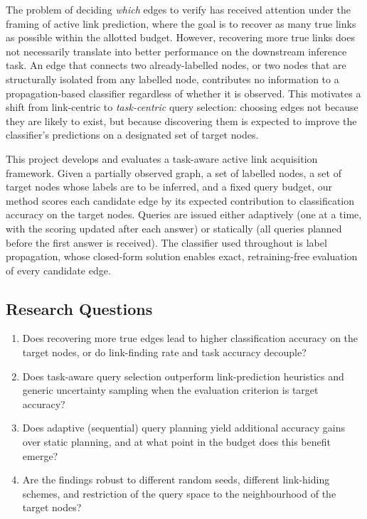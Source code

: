 \documentclass[11pt,a4paper]{article}
\begin{document}
The problem of deciding \emph{which} edges to verify has received attention under the framing
of active link prediction, where the goal is to recover as many true links as possible within
the allotted budget. However, recovering more true links does not necessarily translate into
better performance on the downstream inference task. An edge that connects two already-labelled
nodes, or two nodes that are structurally isolated from any labelled node, contributes no
information to a propagation-based classifier regardless of whether it is observed. This
motivates a shift from link-centric to \emph{task-centric} query selection: choosing edges
not because they are likely to exist, but because discovering them is expected to improve
the classifier's predictions on a designated set of target nodes.

This project develops and evaluates a task-aware active link acquisition framework. Given a
partially observed graph, a set of labelled nodes, a set of target nodes whose labels are to
be inferred, and a fixed query budget, our method scores each candidate edge by its expected
contribution to classification accuracy on the target nodes. Queries are issued either
adaptively (one at a time, with the scoring updated after each answer) or statically (all
queries planned before the first answer is received). The classifier used throughout is label
propagation, whose closed-form solution enables exact, retraining-free evaluation of every
candidate edge.

\subsection{Research Questions}

\begin{enumerate}[leftmargin=3.4em,labelwidth=3em,align=left]
\item[\textbf{RQ1}] Does recovering more true edges lead to higher classification accuracy on
the target nodes, or do link-finding rate and task accuracy decouple?
\item[\textbf{RQ2}] Does task-aware query selection outperform link-prediction heuristics and
generic uncertainty sampling when the evaluation criterion is target accuracy?
\item[\textbf{RQ3}] Does adaptive (sequential) query planning yield additional accuracy gains
over static planning, and at what point in the budget does this benefit emerge?
\item[\textbf{RQ4}] Are the findings robust to different random seeds, different link-hiding
schemes, and restriction of the query space to the neighbourhood of the target nodes?
\end{enumerate}
\end{document}
